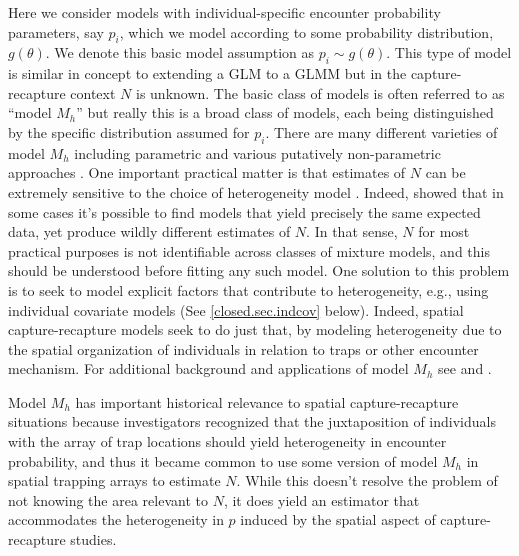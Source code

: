 Here we consider models with individual-specific encounter probability
parameters, say $p_{i}$, which we model according to some probability
distribution, $g(\theta)$. We denote this basic model assumption as
$p_{i} \sim g(\theta)$. This type of model is similar in concept to
extending a GLM to a GLMM but in the capture-recapture context $N$ is
unknown.  The basic class of models is often referred to as ``model
$M_h$'' but really this is a broad class of models, each being
distinguished by the specific distribution assumed for $p_{i}$.  There
are many different varieties of model $M_{h}$ including parametric and
various putatively non-parametric approaches
\citep{burnham_overton:1978, norris_pollock:1996, pledger:2000}. One
important practical matter is that estimates of $N$ can be extremely
sensitive to the choice of heterogeneity model
\citep{fienberg_etal:1999, dorazio_royle:2003, link:2003}. Indeed,
\citet{link:2003} showed that in some cases it's possible to find
models that yield precisely the same expected data, yet produce wildly
different estimates of $N$. In that sense, $N$ for most practical
purposes is not identifiable across classes of mixture models, and
this should be understood before fitting any such model. One solution
to this problem is to seek to model explicit factors that contribute
to heterogeneity, e.g., using individual covariate models (See
\ref{closed.sec.indcov} below). Indeed, spatial capture-recapture
models seek to do just that, by modeling heterogeneity due to the
spatial organization of individuals in relation to traps or other
encounter mechanism.  For additional background and applications of
model $M_{h}$ see \citet[][Chapt. 6]{royle_dorazio:2008} and
\citet[][Chapt. 6]{kery_schaub:2011}.

Model $M_{h}$ has important historical relevance to spatial
capture-recapture situations \citep{karanth:1995} because
investigators recognized that the juxtaposition of individuals with
the array of trap locations should yield heterogeneity in encounter
probability, and thus it became common to use some version of model $M_h$
in spatial trapping arrays to estimate $N$.  While this doesn't
resolve the problem of not knowing the area relevant to $N$, it does
yield an estimator that accommodates the heterogeneity in $p$ induced
by the spatial aspect of capture-recapture studies.

